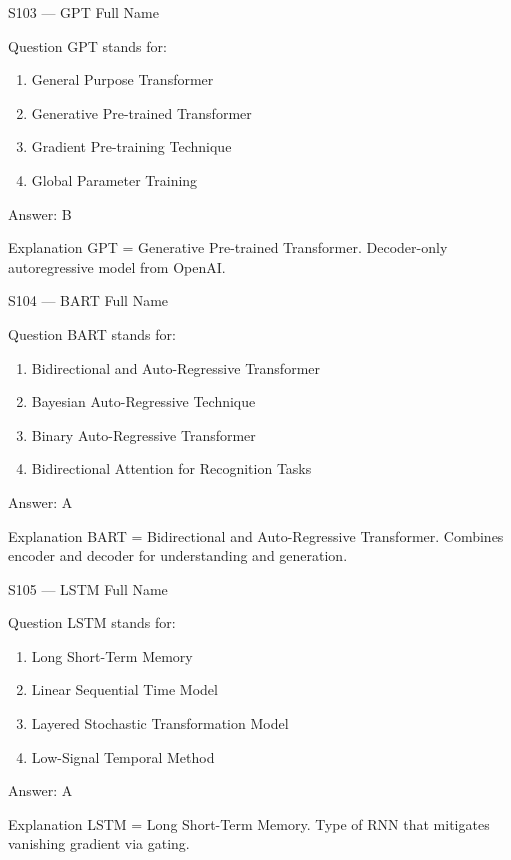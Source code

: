 \documentclass[aspectratio=169,8pt]{beamer}
\begin{document}
	\begin{frame}{S103 --- GPT Full Name}
		\begin{block}{Question}
			GPT stands for:
			\begin{enumerate}
				\item General Purpose Transformer
				\item Generative Pre-trained Transformer
				\item Gradient Pre-training Technique
				\item Global Parameter Training
			\end{enumerate}
		\end{block}
		\begin{exampleblock}{Answer: B}\end{exampleblock}
		\begin{block}{Explanation}
			GPT = Generative Pre-trained Transformer. Decoder-only autoregressive model from OpenAI.
		\end{block}
	\end{frame}
	
	\begin{frame}{S104 --- BART Full Name}
		\begin{block}{Question}
			BART stands for:
			\begin{enumerate}
				\item Bidirectional and Auto-Regressive Transformer
				\item Bayesian Auto-Regressive Technique
				\item Binary Auto-Regressive Transformer
				\item Bidirectional Attention for Recognition Tasks
			\end{enumerate}
		\end{block}
		\begin{exampleblock}{Answer: A}\end{exampleblock}
		\begin{block}{Explanation}
			BART = Bidirectional and Auto-Regressive Transformer. Combines encoder and decoder for understanding and generation.
		\end{block}
	\end{frame}
	
	\begin{frame}{S105 --- LSTM Full Name}
		\begin{block}{Question}
			LSTM stands for:
			\begin{enumerate}
				\item Long Short-Term Memory
				\item Linear Sequential Time Model
				\item Layered Stochastic Transformation Model
				\item Low-Signal Temporal Method
			\end{enumerate}
		\end{block}
		\begin{exampleblock}{Answer: A}\end{exampleblock}
		\begin{block}{Explanation}
			LSTM = Long Short-Term Memory. Type of RNN that mitigates vanishing gradient via gating.
		\end{block}
	\end{frame}
	
\end{document}
